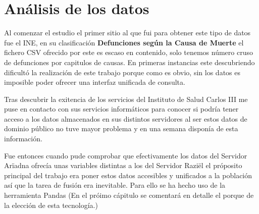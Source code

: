 \chapter{Análisis de los datos}

Al comenzar el estudio el primer sitio al que fui para obtener este tipo de datos fue el \cite{INE} INE, en su clasificación
\textbf{Defunciones según la Causa de Muerte} el fichero CSV ofrecido por este es escaso en contenido, solo tenemos
número cruso de defunciones por capitulos de causas. En primeras instancias este descubriendo dificultó la realización
de este trabajo porque como es obvio, sin los datos es imposible poder ofrecer una interfaz unificada de consulta.

Tras descubrir la exitencia de los servicios del \cite{isciii} Instituto de Salud Carlos III me puse en contacto
con sus servicios informáticos para conocer si podría tener acceso a los datos almacenados en sus distintos servidores
al ser estos datos de dominio público no tuve mayor problema y en una semana disponía de esta información.

Fue entonces cuando pude comprobar que efectivamente los datos del Servidor Arïadna ofrecía unas variables distintas
a los del Servidor Raziël el próposito principal del trabajo era poner estos datos accesibles y unificados a la población
así que la tarea de fusión era inevitable. 
Para ello se ha hecho uso de la herramienta Pandas
(En el próimo cápitulo se comentará en detalle el porque de la elección 
de esta tecnología.)
